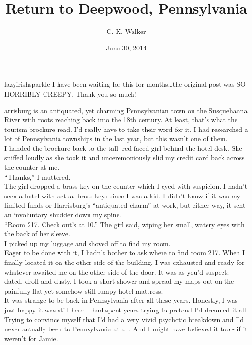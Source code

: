 \documentclass[a5paper]{scrartcl}
\title{Return to Deepwood, Pennsylvania}
\author{C. K. Walker}
\date{June 30, 2014}
\begin{document}
\maketitle

\begin{shadequote}[l]{lazyirishsparkle}
I have been waiting for this for months\dots the original post was SO HORRIBLY CREEPY. Thank you so much!
\end{shadequote}
\clearpage

arrisburg is an antiquated, yet charming Pennsylvanian town on the Susquehanna River with roots reaching back into the 18th century. At least, that's what the tourism brochure read. I'd really have to take their word for it.  I had researched a lot of Pennsylvania townships in the last year, but this wasn't one of them.\\


I handed the brochure back to the tall, red faced girl behind the hotel desk. She sniffed loudly as she took it and unceremoniously slid my credit card back across the counter at me.\\


\enquote{Thanks,} I muttered.\\


The girl dropped a brass key on the counter which I eyed with suspicion. I hadn't seen a hotel with actual brass keys since I was a kid. I didn't know if it was my limited funds or Harrisburg's \enquote{antiquated charm} at work, but either way, it sent an involuntary shudder down my spine.\\


\enquote{Room 217. Check out's at 10.} The girl said, wiping her small, watery eyes with the back of her sleeve.\\


I picked up my luggage and shoved off to find my room. \\


Eager to be done with it, I hadn't bother to ask where to find room 217. When I finally located it on the other side of the building, I was exhausted and ready for whatever awaited me on the other side of the door. It was as you'd suspect: dated, droll and dusty. I took a short shower and spread my maps out on the painfully flat yet somehow still lumpy hotel mattress.\\


It was strange to be back in Pennsylvania after all these years. Honestly, I was just happy it was still here. I had spent years trying to pretend I'd dreamed it all. Trying to convince myself that I'd had a very vivid psychotic breakdown and I'd never actually been to Pennsylvania at all. And I might have believed it too - if it weren't for Jamie.\\
\end{document}
